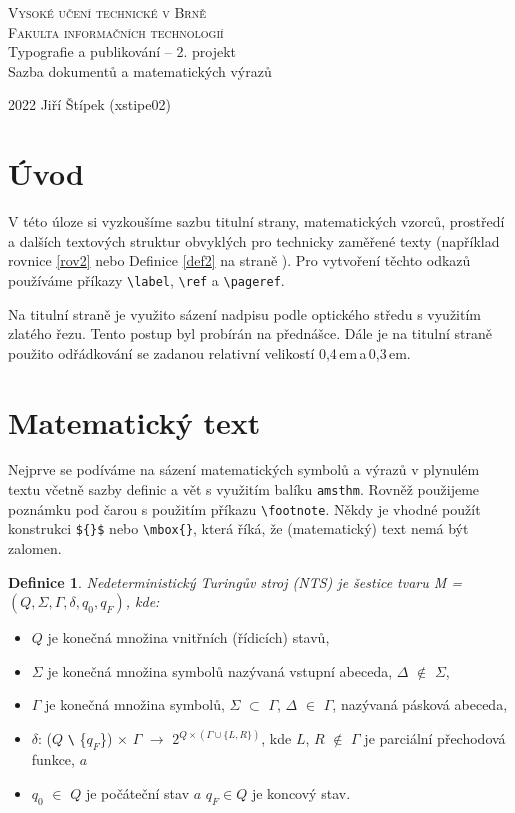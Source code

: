 \documentclass[twocolumn, 11pt, a4paper]{article}
\newtheorem{definition}{Definice}
\begin{document}
\begin{titlepage}
\begin{center}
    {\Huge \textsc{Vysoké učení technické v Brně}}\\[0.4em]
    {\huge \textsc{Fakulta informačních technologií}}\\
    {\LARGE Typografie a publikování -- 2. projekt\\[0.3em]
    Sazba dokumentů a matematických výrazů}
\end{center}
{\Large 2022 \hfill Jiří Štípek (xstipe02)}
\end{titlepage}
\newpage
\begin{twocolumn}
\label{page1}
\section*{Úvod}
V této úloze si vyzkoušíme sazbu titulní strany, matematických vzorců, prostředí a dalších textových struktur obvyklých pro technicky zaměřené texty (například rovnice \eqref{rov2} nebo Definice \ref{def2} na straně \pageref{page1}). Pro vytvoření těchto odkazů používáme příkazy \verb-\label-, \verb-\ref- a \verb-\pageref-.

Na titulní straně je využito sázení nadpisu podle optického středu s využitím zlatého řezu. Tento postup byl probírán na přednášce. Dále je na titulní straně použito odřádkování se zadanou relativní velikostí 0,4\,em\,a\,0,3\,em.
\section{Matematický text}
Nejprve se podíváme na sázení matematických symbolů a výrazů v plynulém textu včetně sazby definic a vět s využitím balíku \verb-amsthm-. Rovněž použijeme poznámku pod čarou s použitím příkazu \verb-\footnote-. Někdy je vhodné použít konstrukci \verb-${}$- nebo \verb-\mbox{}-, která říká, že (matematický) text nemá být zalomen.
\begin{definition}\textup{Nedeterministický Turingův stroj} (NTS) je šestice tvaru M = $(Q,\Sigma, \Gamma, \delta, q_0, q_F)$, kde:\end{definition}
\begin{itemize}
    \item $Q$ je konečná množina vnitřních (řídicích) stavů,
    \item $\Sigma$ je konečná množina symbolů nazývaná vstupní abeceda, $\Delta$ $\notin$ $\Sigma$,
    \item $\Gamma$ je konečná množina symbolů, $\Sigma$ $\subset$ $\Gamma$, $\Delta$ $\in$ $\Gamma$, nazývaná pásková abeceda,
    \item $\delta$: ($Q$ \verb-\- \{$q_F$\}) $\times$ $\Gamma$ $\rightarrow$ $2^{Q \times (\Gamma \cup \{L,R\} ) }$, kde $L$, $R$ $\notin$ $\Gamma$ je parciální přechodová funkce, $a$
    \item $q_0$ $\in$ $Q$ je počáteční stav $a$ $q_F \in Q $ je koncový stav.
\end{itemize}


\end{twocolumn}
\end{document}
